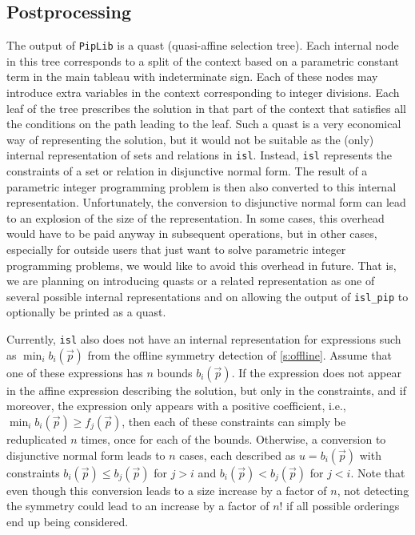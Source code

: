 \subsection{Postprocessing}\label{s:post}

The output of {\tt PipLib} is a quast (quasi-affine selection tree).
Each internal node in this tree corresponds to a split of the context
based on a parametric constant term in the main tableau with indeterminate
sign.  Each of these nodes may introduce extra variables in the context
corresponding to integer divisions.  Each leaf of the tree prescribes
the solution in that part of the context that satisfies all the conditions
on the path leading to the leaf.
Such a quast is a very economical way of representing the solution, but
it would not be suitable as the (only) internal representation of
sets and relations in {\tt isl}.  Instead, {\tt isl} represents
the constraints of a set or relation in disjunctive normal form.
The result of a parametric integer programming problem is then also
converted to this internal representation.  Unfortunately, the conversion
to disjunctive normal form can lead to an explosion of the size
of the representation.
In some cases, this overhead would have to be paid anyway in subsequent
operations, but in other cases, especially for outside users that just
want to solve parametric integer programming problems, we would like
to avoid this overhead in future.  That is, we are planning on introducing
quasts or a related representation as one of several possible internal
representations and on allowing the output of {\tt isl\_pip} to optionally
be printed as a quast.

Currently, {\tt isl} also does not have an internal representation
for expressions such as $\min_i b_i(\vec p)$ from the offline
symmetry detection of \autoref{s:offline}.
Assume that one of these expressions has $n$ bounds $b_i(\vec p)$.
If the expression
does not appear in the affine expression describing the solution,
but only in the constraints, and if moreover, the expression
only appears with a positive coefficient, i.e.,
$\min_i b_i(\vec p) \ge f_j(\vec p)$, then each of these constraints
can simply be reduplicated $n$ times, once for each of the bounds.
Otherwise, a conversion to disjunctive normal form
leads to $n$ cases, each described as $u = b_i(\vec p)$ with constraints
$b_i(\vec p) \le b_j(\vec p)$ for $j > i$
and
$b_i(\vec p)  < b_j(\vec p)$ for $j < i$.
Note that even though this conversion leads to a size increase
by a factor of $n$, not detecting the symmetry could lead to
an increase by a factor of $n!$ if all possible orderings end up being
considered.


